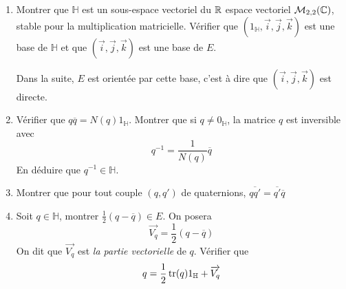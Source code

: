 \begin{enumerate}
\item Montrer que $\mathbb{H}$ est un sous-espace vectoriel du $\mathbb{R}$ espace vectoriel $\mathcal{M}_{2,2}(\mathbb{C})$, stable pour la multiplication matricielle. Vérifier que $(1_{\mathbb{H}},\overrightarrow{i},\overrightarrow{j},\overrightarrow{k})$ est une base de $\mathbb{H}$ et que $(\overrightarrow{i},\overrightarrow{j},\overrightarrow{k})$ est une base de $E$.

Dans la suite, $E$ est orientée par cette base, c'est à dire que $(\overrightarrow{i},\overrightarrow{j},\overrightarrow{k})$ est directe.

\item Vérifier que $q \overline{q}=N(q)1_{\mathbb{H}}$. Montrer que si $q\neq 0_{\mathbb{H}}$, la matrice $q$ est inversible avec
\[q^{-1}=\frac{1}{N(q)}\overline{q}\]
En déduire que $q^{-1} \in \mathbb{H}$.

\item Montrer que pour tout couple $(q,q')$ de quaternions, $\overline{qq'}=\overline{q'}\overline{q}$
\item Soit $q\in \mathbb{H}$, montrer $\frac{1}{2}(q-\overline{q})\in E$. On posera
\[\overrightarrow{V_q}=\frac{1}{2}(q-\overline{q})\]
On dit que $\overrightarrow{V_q}$ est \emph{la partie vectorielle} de $q$. Vérifier que
\[q=\frac{1}{2}\operatorname{tr} (q) 1_{\mathbb{H}} + \overrightarrow{V_q}\]
\end{enumerate} 

